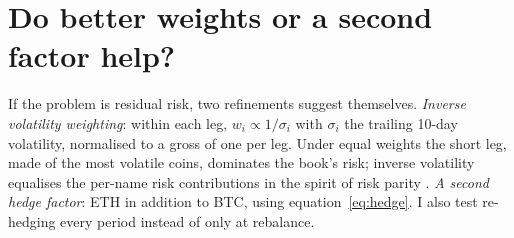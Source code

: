 \documentclass[11pt,a4paper]{article}
\begin{document}
\section{Do better weights or a second factor help?}\label{sec:variants}

If the problem is residual risk, two refinements suggest themselves. \emph{Inverse
volatility weighting}: within each leg, $w_i \propto 1/\sigma_i$ with $\sigma_i$ the
trailing 10-day volatility, normalised to a gross of one per leg. Under equal weights
the short leg, made of the most volatile coins, dominates the book's risk; inverse
volatility equalises the per-name risk contributions in the spirit of risk parity
\citep{maillard2010properties}. \emph{A second hedge factor}: ETH in addition to BTC,
using equation~\eqref{eq:hedge}. I also test re-hedging every period instead of only
at rebalance.

\begin{table}[t]
  \centering
  \small
  \setlength{\tabcolsep}{4.5pt}
  \caption{Weighting and hedge variants. SR: annualised Sharpe ratio. CAGR, carry
  (annualised), price-leg volatility and maximum drawdown in percent. All variants
  trade the same periods after a 35-day warm-up, with 8 bps costs on turnover.}
  \label{tab:variants}
\end{table}
\end{document}
